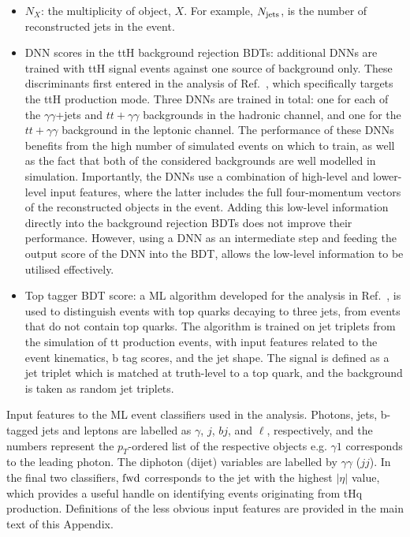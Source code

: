 \begin{itemize}
    \item $N_{X}$: the multiplicity of object, $X$. For example, $N_{\rm{jets}}$, is the number of reconstructed jets in the event.
    \item DNN scores in the ttH background rejection BDTs: additional DNNs are trained with ttH signal events against one source of background only. These discriminants first entered in the \Hgg analysis of Ref.~\cite{Sirunyan:2020sum}, which specifically targets the ttH production mode. Three DNNs are trained in total: one for each of the $\gamma\gamma$+jets and $tt+\gamma\gamma$ backgrounds in the hadronic channel, and one for the $tt+\gamma\gamma$ background in the leptonic channel. The performance of these DNNs benefits from the high number of simulated events on which to train, as well as the fact that both of the considered backgrounds are well modelled in simulation. Importantly, the DNNs use a combination of high-level and lower-level input features, where the latter includes the full four-momentum vectors of the reconstructed objects in the event. Adding this low-level information directly into the background rejection BDTs does not improve their performance. However, using a DNN as an intermediate step and feeding the output score of the DNN into the BDT, allows the low-level information to be utilised effectively.
    \item Top tagger BDT score: a ML algorithm developed for the analysis in Ref.~\cite{Sirunyan:2017wif}, is used to distinguish events with top quarks decaying to three jets, from events that do not contain top quarks. The algorithm is trained on jet triplets from the simulation of tt production events, with input features related to the event kinematics, b tag scores, and the jet shape. The signal is defined as a jet triplet which is matched at truth-level to a top quark, and the background is taken as random jet triplets.
\end{itemize}

\begin{table}
    \caption[Input features to the \Hgg event classifiers]{Input features to the ML event classifiers used in the \Hgg analysis. Photons, jets, b-tagged jets and leptons are labelled as $\gamma$, $j$, $bj$, and $\ell$, respectively,  and the numbers represent the $p_T$-ordered list of the respective objects e.g. $\gamma 1$ corresponds to the leading photon. The diphoton (dijet) variables are labelled by $\gamma\gamma$ ($jj$). In the final two classifiers, $\rm{fwd}$ corresponds to the jet with the highest $|\eta|$ value, which provides a useful handle on identifying events originating from tHq production. Definitions of the less obvious input features are provided in the main text of this Appendix.}
    \label{tab:categorisation_input_features}
    \centering
    \scriptsize
    \renewcommand{\arraystretch}{3}
    \setlength{\tabcolsep}{6pt}
    
\end{table}

